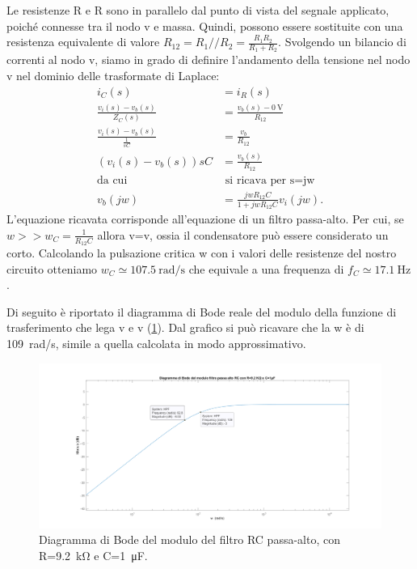 \noindent
Le resistenze R e R sono in parallelo dal punto di vista del segnale applicato, poiché connesse tra il nodo v e massa. Quindi, possono essere sostituite con una resistenza equivalente di valore $R_{12}=R_1 // R_2=\frac{R_1 R_2}{R_1+R_2}$. Svolgendo un bilancio di correnti al nodo v, siamo in grado di definire l'andamento della tensione nel nodo v nel dominio delle trasformate di Laplace:
\begin{equation}
	\begin{split}
		i_C(s)&=i_R(s) \\
		\frac{v_i(s)-v_b(s)}{Z_C(s)}&=\frac{v_b(s)-\SI{0}{\volt}}{R_{12}} \\
		\frac{v_i(s)-v_b(s)}{\frac{1}{sC}}&=\frac{v_b}{R_{12}} \\
		(v_i(s)-v_b(s))sC&=\frac{v_b(s)}{R_{12}} \\
		\text{da cui} & \text{ si ricava per s=jw} \\
		v_b(jw)&=\frac{jwR_{12}C}{1+jwR_{12}C}v_i(jw).
	\end{split}
\end{equation}
L'equazione ricavata corrisponde all'equazione di un filtro passa-alto. Per cui, se $w>>w_C=\frac{1}{R_{12}C}$ allora v=v, ossia il condensatore può essere considerato un corto. Calcolando la pulsazione critica w con i valori delle resistenze del nostro circuito otteniamo $w_C\simeq \SI{107.5}{\radian/\second}$ che equivale a una frequenza di $f_C\simeq\SI{17.1}{\hertz}$.

Di seguito è riportato il diagramma di Bode reale del modulo della funzione di trasferimento che lega v e v (\Fig\ref{fig:hpf}). Dal grafico si può ricavare che la w è di \SI{109}{\radian/\second}, simile a quella calcolata in modo approssimativo. 
\begin{figure}[h!]
	\centering
	\includegraphics[width=1\linewidth]{./OtherFiles/Laboratorio 4/boderc.png}
	\caption{Diagramma di Bode del modulo del filtro RC passa-alto, con R=\SI{9.2}{\kilo\ohm} e C=\SI{1}{\micro\farad}.}
	\label{fig:hpf}
\end{figure}

